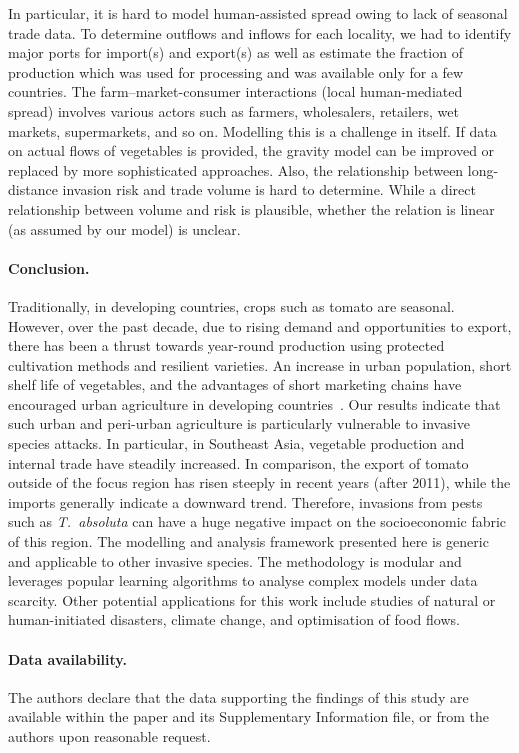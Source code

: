 \documentclass[11pt]{article}
\newcommand{\tuta}{\emph{T.~absoluta}}
\theoremstyle{definition}
\begin{document}
In particular, it is hard to model human-assisted spread owing to lack of
seasonal trade data. To determine outflows and inflows for each locality,
we had to identify major ports for import(s) and export(s) as well as
estimate the fraction of production which was used for processing and was
available only for a few countries. The farm--market-consumer interactions
(local human-mediated spread) involves various actors such as farmers,
wholesalers, retailers, wet markets, supermarkets, and so on. Modelling
this is a challenge in itself. If data on actual flows of vegetables is
provided, the gravity model can be improved or replaced by more
sophisticated approaches. Also, the relationship between long-distance
invasion risk and trade volume is hard to determine. While a direct
relationship between volume and risk is plausible, whether the relation is
linear (as assumed by our model) is unclear.

\paragraph{Conclusion.} Traditionally, in developing countries, crops such
as tomato are seasonal. However, over the past decade, due to rising demand and
opportunities to export, there has been a thrust towards year-round
production using protected cultivation methods and resilient varieties.
An increase in urban population, short shelf life of vegetables, and the
advantages of short marketing chains have encouraged urban agriculture in
developing countries~\cite{moustier2015urban}. Our results indicate that
such urban and peri-urban agriculture is particularly vulnerable to
invasive species attacks. In particular, in Southeast Asia, vegetable
production and internal trade have steadily increased. In comparison, the
export of tomato outside of the focus region has risen steeply in 
recent years (after 2011), while the imports generally indicate a downward
trend.  Therefore, invasions from pests such as \tuta{} can have a huge
negative impact on the socioeconomic fabric of this region. The modelling
and analysis framework presented here is generic and applicable to other
invasive species.  The methodology is modular and leverages popular
learning algorithms to analyse complex models under data scarcity.  Other
potential applications for this work include studies of natural or
human-initiated disasters, climate change, and optimisation of food flows.
\paragraph{Data availability.} The authors declare that the data supporting the
findings of this study are available within the paper and its Supplementary
Information file, or from the authors upon reasonable request.
\end{document}
